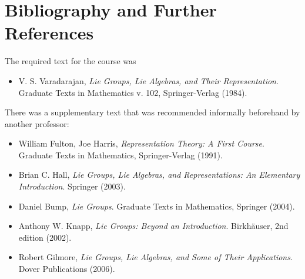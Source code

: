
\appendix
\renewcommand{\leftmark}{Bibliography and Further References}
\section{Bibliography and Further References}

The required text for the course was
\begin{itemize}
\item V. S. Varadarajan, \emph{Lie Groups, Lie Algebras, and
  Their Representation}. Graduate Texts in Mathematics v. 102,
  Springer-Verlag (1984).
\end{itemize}
There was a supplementary text that was recommended informally
beforehand by another professor:
\begin{itemize}
\item William Fulton, Joe Harris, \emph{Representation Theory: A
  First Course}. Graduate Texts in Mathematics, Springer-Verlag
  (1991).
\item Brian C. Hall, \emph{Lie Groups, Lie Algebras, and Representations: An Elementary Introduction}.
  Springer (2003).
\item Daniel Bump, \emph{Lie Groups}. Graduate Texts in Mathematics,
  Springer (2004).
\item Anthony W. Knapp, \emph{Lie Groups: Beyond an Introduction}.
  Birkh\"{a}user, 2nd edition (2002).
\item Robert Gilmore, \emph{Lie Groups, Lie Algebras, and Some of Their Applications}.
  Dover Publications (2006).
\end{itemize}

